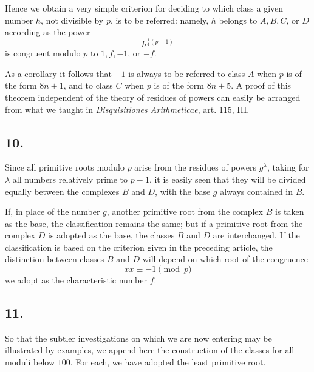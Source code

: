 \documentclass[12pt]{article}
\begin{document}
Hence we obtain a very simple criterion for deciding to which class a given number $h$, not divisible by $p$, is to be referred: namely, $h$ belongs to $A,B,C$, or $D$ according as the power
\[
h^{\frac14(p-1)}
\]
is congruent modulo $p$ to $1,f,-1$, or $-f$.

As a corollary it follows that $-1$ is always to be referred to class $A$ when $p$ is of the form $8n+1$, and to class $C$ when $p$ is of the form $8n+5$. A proof of this theorem independent of the theory of residues of powers can easily be arranged from what we taught in \emph{Disquisitiones Arithmeticae}, art. 115, III.

\subsection*{10.}

Since all primitive roots modulo $p$ arise from the residues of powers $g^\lambda$, taking for $\lambda$ all numbers relatively prime to $p-1$, it is easily seen that they will be divided equally between the complexes $B$ and $D$, with the base $g$ always contained in $B$.

If, in place of the number $g$, another primitive root from the complex $B$ is taken as the base, the classification remains the same; but if a primitive root from the complex $D$ is adopted as the base, the classes $B$ and $D$ are interchanged. If the classification is based on the criterion given in the preceding article, the distinction between classes $B$ and $D$ will depend on which root of the congruence
\[
xx\equiv -1\pmod p
\]
we adopt as the characteristic number $f$.

\subsection*{11.}

So that the subtler investigations on which we are now entering may be illustrated by examples, we append here the construction of the classes for all moduli below $100$. For each, we have adopted the least primitive root.
\end{document}
